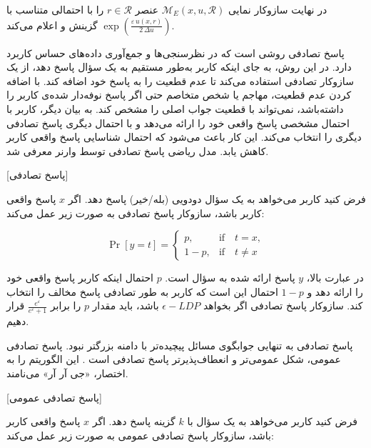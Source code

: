 در نهایت سازوکار نمایی $\mathcal{M}_{E}(x,u,\mathcal{R})$ 
عنصر $r \in \mathcal{R}$ را با احتمالی متناسب با
$\exp\!\left(\frac{\varepsilon\,u(x,r)}{2\,\Delta u}\right)$
گزینش و اعلام می‌کند.


پاسخ تصادفی روشی است که در نظرسنجی‌ها و جمع‌آوری داده‌های حساس کاربرد دارد. در این روش، به جای اینکه کاربر به‌طور مستقیم به یک سؤال پاسخ دهد، از یک سازوکار تصادفی استفاده می‌کند تا عدم قطعیت را به پاسخ خود اضافه کند. با اضافه کردن عدم قطعیت، مهاجم یا شخص متخاصم حتی اگر پاسخ نوفه‌دار شده‌ی کاربر را داشته‌باشد، نمی‌تواند با قطعیت جواب اصلی را مشخص کند. به بیان دیگر، کاربر با احتمال مشخصی پاسخ واقعی خود را ارائه می‌دهد و با احتمال دیگری پاسخ تصادفی دیگری را انتخاب می‌کند. این کار باعث می‌شود که احتمال شناسایی پاسخ واقعی کاربر کاهش یابد. مدل ریاضی پاسخ تصادفی توسط وارنر  معرفی شد.

[پاسخ تصادفی]

فرض کنید کاربر می‌خواهد به یک سؤال دودویی (بله/خیر) پاسخ دهد. اگر $x$ پاسخ واقعی کاربر باشد، سازوکار پاسخ تصادفی به صورت زیر عمل می‌کند:

\begin{equation}
\Pr[y = t] = 
\begin{cases} 
p, & \text{if} \quad t = x, \\[10pt]
1-p, & \text{if} \quad t \neq x
\end{cases}
\end{equation}


در عبارت بالا، $y$ پاسخ ارائه شده به سؤال است. $p$ احتمال اینکه کاربر پاسخ واقعی خود را ارائه دهد و $1{-}p$ احتمال این است که کاربر به طور تصادفی پاسخ مخالف را انتخاب کند. سازوکار پاسخ تصادفی اگر بخواهد $\epsilon{-}LDP$ باشد، باید مقدار $p$ را برابر $\frac{e^{\varepsilon}}{e^{\varepsilon}+1}$ قرار دهیم.


پاسخ تصادفی به تنهایی جوابگوی مسائل پیچیده‌تر با دامنه بزرگتر نبود. پاسخ تصادفی عمومی، شکل عمومی‌تر و انعطاف‌پذیرتر پاسخ تصادفی است . این الگوریتم را به اختصار، «جی آر آر» می‌نامند.

[پاسخ تصادفی عمومی]

فرض کنید کاربر می‌خواهد به یک سؤال با $k$ گزینه پاسخ دهد. اگر $x$ پاسخ واقعی کاربر باشد، سازوکار پاسخ تصادفی عمومی به صورت زیر عمل می‌کند:

